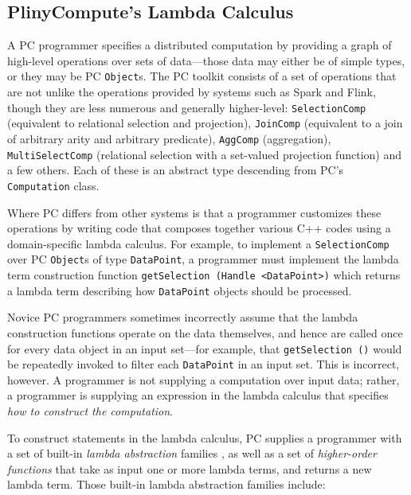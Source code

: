 \subsection{PlinyCompute's Lambda Calculus}
A PC programmer specifies a distributed computation by providing a graph of high-level operations over sets of data---those data
may either be of simple types, or they may be
PC \texttt{Object}s. The PC toolkit consists of a set of
operations 
that are not unlike the operations provided by systems such as Spark and Flink, though they are less numerous and generally higher-level:
\texttt{SelectionComp} (equivalent to relational selection and projection), \texttt{JoinComp} (equivalent to a join of arbitrary arity and arbitrary predicate), 
\texttt{AggComp} (aggregation), \texttt{MultiSelectComp} (relational selection with a set-valued projection function) and a few others.  
Each of these is an abstract type descending from PC's \texttt{Computation} class.

Where PC differs from other systems is that a programmer customizes these operations by writing code that composes together various C++ codes 
using a 
domain-specific lambda calculus.
For example, to implement a \texttt{SelectionComp} over PC \texttt{Object}s of type \texttt{DataPoint}, a programmer
must implement the lambda term construction function \texttt{getSelection (Handle <DataPoint>)} which returns a lambda term
describing how \texttt{DataPoint} objects
should be processed.

Novice PC programmers sometimes incorrectly assume that the lambda construction functions operate on the data themselves, and
hence are called once for every data object in an input set---for example, 
that
\texttt{getSelection ()} would be repeatedly invoked to filter each \texttt{DataPoint} in an input set.  
This is incorrect, however.
A programmer is not supplying a computation over input data; rather, a programmer is supplying an expression in the lambda calculus that 
specifies \emph{how to construct the computation}.

To construct statements in the lambda calculus, PC supplies a programmer with a set of built-in \emph{lambda abstraction} 
families \cite{miller1991logic}, as 
well as a set of \emph{higher-order functions} \cite{chen1993hilog}
that take as input one or more lambda terms, and returns a new lambda term.  Those built-in lambda abstraction families 
include:

